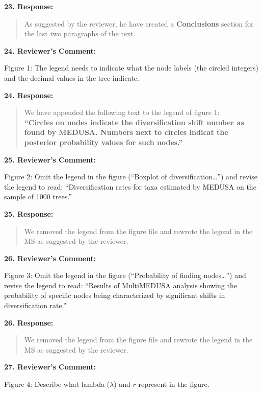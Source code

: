 \documentclass[]{article}
\begin{document}
\textbf{23. Response:}

\begin{quote}
\color{blue}
As suggested by the reviewer, he have created a \textbf{Conclusions}
section for the last two paragraphs of the text.
\end{quote}

\textbf{24. Reviewer's Comment:}

Figure 1: The legend needs to indicate what the node labels (the circled
integers) and the decimal values in the tree indicate.

\textbf{24. Response:}

\begin{quote}
\color{blue}
We have appended the following text to the legend of figure
1:\\\textbf{``Circles on nodes indicate the diversification shift number
as found by MEDUSA. Numbers next to circles indicat the posterior
probability values for such nodes.''}
\end{quote}

\textbf{25. Reviewer's Comment:}

Figure 2: Omit the legend in the figure (``Boxplot of
diversification\ldots{}'') and revise the legend to read:
``Diversification rates for taxa estimated by MEDUSA on the sample of
1000 trees.''

\textbf{25. Response:}

\begin{quote}
\color{blue}
We removed the legend from the figure file and rewrote the legend in the
MS as suggested by the reviewer.
\end{quote}

\textbf{26. Reviewer's Comment:}

Figure 3: Omit the legend in the figure (``Probability of finding
nodes\ldots{}'') and revise the legend to read: ``Results of MultiMEDUSA
analysis showing the probability of specific nodes being characterized
by significant shifts in diversification rate.''

\textbf{26. Response:}

\begin{quote}
\color{blue}
We removed the legend from the figure file and rewrote the legend in the
MS as suggested by the reviewer.
\end{quote}

\textbf{27. Reviewer's Comment:}

Figure 4: Describe what lambda (\(\lambda\)) and \(r\) represent in the
figure.
\end{document}
